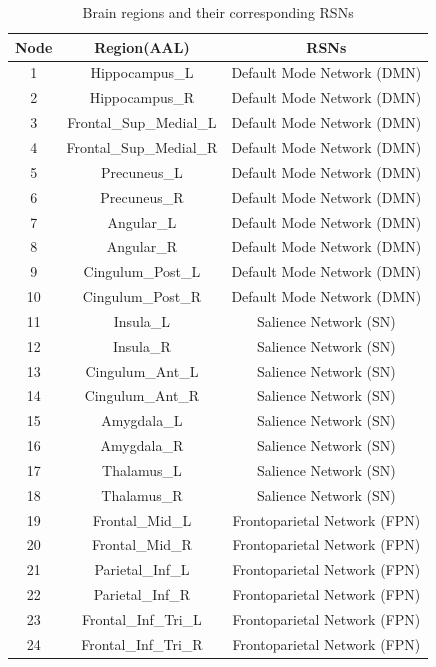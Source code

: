 \documentclass[lettersize,journal]{IEEEtran}
\begin{document}
\begin{table}[htbp]
\centering
\caption{Brain regions and their corresponding RSNs}
\begin{tabular}{ccc}
\toprule
\textbf{Node} & \textbf{Region(AAL)} & \textbf{RSNs} \\
\midrule
1  & Hippocampus\_L        & Default Mode Network (DMN) \\
2  & Hippocampus\_R        & Default Mode Network (DMN) \\
3  & Frontal\_Sup\_Medial\_L & Default Mode Network (DMN) \\
4  & Frontal\_Sup\_Medial\_R & Default Mode Network (DMN) \\
5  & Precuneus\_L          & Default Mode Network (DMN) \\
6  & Precuneus\_R          & Default Mode Network (DMN) \\
7  & Angular\_L            & Default Mode Network (DMN) \\
8  & Angular\_R            & Default Mode Network (DMN) \\
9  & Cingulum\_Post\_L     & Default Mode Network (DMN) \\
10 & Cingulum\_Post\_R     & Default Mode Network (DMN) \\
11 & Insula\_L             & Salience Network (SN) \\
12 & Insula\_R             & Salience Network (SN) \\
13 & Cingulum\_Ant\_L      & Salience Network (SN) \\
14 & Cingulum\_Ant\_R      & Salience Network (SN) \\
15 & Amygdala\_L           & Salience Network (SN) \\
16 & Amygdala\_R           & Salience Network (SN) \\
17 & Thalamus\_L           & Salience Network (SN) \\
18 & Thalamus\_R           & Salience Network (SN) \\
19 & Frontal\_Mid\_L       & Frontoparietal Network (FPN) \\
20 & Frontal\_Mid\_R       & Frontoparietal Network (FPN) \\
21 & Parietal\_Inf\_L      & Frontoparietal Network (FPN) \\
22 & Parietal\_Inf\_R      & Frontoparietal Network (FPN) \\
23 & Frontal\_Inf\_Tri\_L  & Frontoparietal Network (FPN) \\
24 & Frontal\_Inf\_Tri\_R  & Frontoparietal Network (FPN) \\

\end{tabular}
\end{table}
\end{document}
